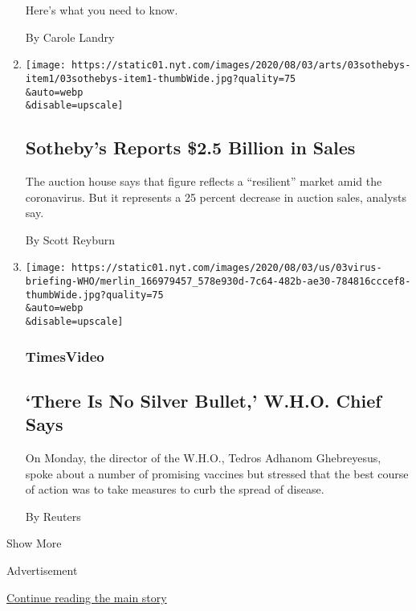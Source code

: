 \begin{enumerate}
  Here's what you need to know.

  By Carole Landry
\item
  \href{/2020/08/03/arts/design/sothebys-sales.html}{}

  \texttt{[image: https://static01.nyt.com/images/2020/08/03/arts/03sothebys-item1/03sothebys-item1-thumbWide.jpg?quality=75\\\&auto=webp\\\&disable=upscale]}

  \hypertarget{sothebys-reports-25-billion-in-sales}{%
  \subsection{Sotheby's Reports \$2.5 Billion in
  Sales}\label{sothebys-reports-25-billion-in-sales}}

  The auction house says that figure reflects a ``resilient'' market
  amid the coronavirus. But it represents a 25 percent decrease in
  auction sales, analysts say.

  By Scott Reyburn
\item
  \href{/video/world/europe/100000007269932/who-coronavirus-briefing.html}{}

  \texttt{[image: https://static01.nyt.com/images/2020/08/03/us/03virus-briefing-WHO/merlin\_166979457\_578e930d-7c64-482b-ae30-784816cccef8-thumbWide.jpg?quality=75\\\&auto=webp\\\&disable=upscale]}

  \hypertarget{timesvideo-1}{%
  \subsubsection{TimesVideo}\label{timesvideo-1}}

  \hypertarget{there-is-no-silver-bullet-who-chief-says}{%
  \subsection{`There Is No Silver Bullet,' W.H.O. Chief
  Says}\label{there-is-no-silver-bullet-who-chief-says}}

  On Monday, the director of the W.H.O., Tedros Adhanom Ghebreyesus,
  spoke about a number of promising vaccines but stressed that the best
  course of action was to take measures to curb the spread of disease.

  By Reuters
\end{enumerate}

Show More

Advertisement

\protect\hyperlink{after-mid4}{Continue reading the main story}


